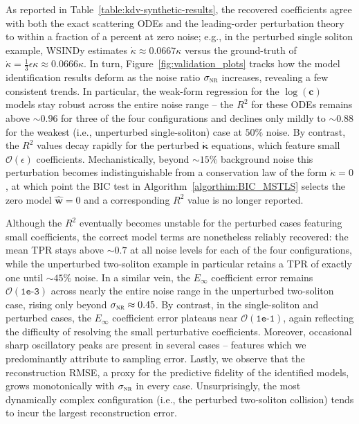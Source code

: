 \documentclass[journal=gmj]{CUP-JNL-DTM}%
\theoremstyle{definition}
\numberwithin{equation}{section}
\begin{document}
As reported in Table~\ref{table:kdv-synthetic-results}, the recovered coefficients agree with both the exact scattering ODEs and the leading-order perturbation theory to within a fraction of a percent at zero noise; e.g., in the perturbed single soliton example, WSINDy estimates $\dot{\kappa} \approx 0.0667\kappa$ versus the ground-truth of $\dot{\kappa} = \tfrac{1}{3} \epsilon\kappa \approx 0.0666\kappa$. In turn, Figure~\ref{fig:validation_plots} tracks how the model identification results deform as the noise ratio $\sigma_{\textsc{nr}}$ increases, revealing a few consistent trends. In particular, the weak-form regression for the $\log(\mathbf{c})$ models stay robust across the entire noise range -- the $R^2$ for these ODEs remains above $\sim\!0.96$ for three of the four configurations and declines only mildly to $\sim\!0.88$ for the weakest (i.e., unperturbed single-soliton) case at $50\%$ noise. By contrast, the $R^2$ values decay rapidly for the perturbed $\dot{\boldsymbol{\kappa}}$ equations, which feature small $\mathcal{O}(\epsilon)$ coefficients. Mechanistically, beyond $\sim\!15\%$ background noise this perturbation becomes indistinguishable from a conservation law of the form $\dot{\kappa} = 0$, at which point the BIC test in Algorithm~\ref{algorthim:BIC_MSTLS} selects the zero model $\hat{\mathbf{w}} = 0$ and a corresponding $R^2$ value is no longer reported.

\newpage

Although the $R^2$ eventually becomes unstable for the perturbed cases featuring small coefficients, the correct model terms are nonetheless reliably recovered: the mean TPR stays above $\sim\!0.7$ at all noise levels for each of the four configurations, while the unperturbed two-soliton example in particular retains a TPR of exactly one until $\sim\!45\%$ noise. In a similar vein, the $E_{\infty}$ coefficient error remains $\mathcal{O}(\texttt{1e-3})$ across nearly the entire noise range in the unperturbed two-soliton case, rising only beyond $\sigma_{\textsc{nr}} \approx 0.45$. By contrast, in the single-soliton and perturbed cases, the $E_{\infty}$ coefficient error plateaus near $\mathcal{O}(\texttt{1e-1})$, again reflecting the difficulty of resolving the small perturbative coefficients. Moreover, occasional sharp oscillatory peaks are present in several cases -- features which we predominantly attribute to sampling error. Lastly, we observe that the reconstruction RMSE, a proxy for the predictive fidelity of the identified models, grows monotonically with $\sigma_{\textsc{nr}}$ in every case. Unsurprisingly, the most dynamically complex configuration (i.e., the perturbed two-soliton collision) tends to incur the largest reconstruction error.
\end{document}
